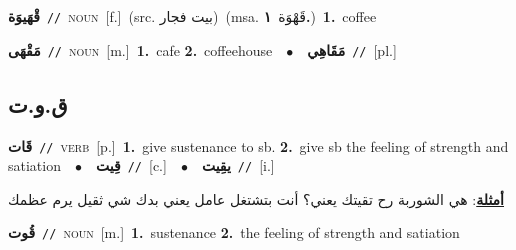 \documentclass[10pt,a4paper,twoside]{article} %
\begin{document}
\begin{multicols}{2}
{\setlength\topsep{0pt}\textbf{\foreignlanguage{arabic}{قْهَيوَة}}\ {\color{gray}\texttt{//}\color{black}}\ \textsc{noun}\ [f.]\ (src. \color{gray}\foreignlanguage{arabic}{بيت فجار}\color{black})\ \color{gray}(msa. \foreignlanguage{arabic}{قَهْوَة}~\foreignlanguage{arabic}{\textbf{١.}})\color{black}\ \textbf{1.}~coffee\ } \vspace{2mm}

{\setlength\topsep{0pt}\textbf{\foreignlanguage{arabic}{مَقْهَى}}\ {\color{gray}\texttt{//}\color{black}}\ \textsc{noun}\ [m.]\ \textbf{1.}~cafe  \textbf{2.}~coffeehouse\ \ $\bullet$\ \ \setlength\topsep{0pt}\textbf{\foreignlanguage{arabic}{مَقَاهِي}}\ {\color{gray}\texttt{//}\color{black}}\ [pl.]\ } \vspace{2mm}

\vspace{-3mm}
\subsection*{\color{blue}\foreignlanguage{arabic}{ق.و.ت}\color{blue}{}} 

{\setlength\topsep{0pt}\textbf{\foreignlanguage{arabic}{قَات}}\ {\color{gray}\texttt{//}\color{black}}\ \textsc{verb}\ [p.]\ \textbf{1.}~give sustenance to sb.  \textbf{2.}~give sb the feeling of strength and satiation\ \ $\bullet$\ \ \setlength\topsep{0pt}\textbf{\foreignlanguage{arabic}{قِيت}}\ {\color{gray}\texttt{//}\color{black}}\ [c.]\ \ $\bullet$\ \ \setlength\topsep{0pt}\textbf{\foreignlanguage{arabic}{يقِيت}}\ {\color{gray}\texttt{//}\color{black}}\ [i.]\  \begin{flushright}\color{gray}\foreignlanguage{arabic}{\textbf{\underline{\foreignlanguage{arabic}{أمثلة}}}: هي الشوربة رح تقيتك يعني؟ أنت بتشتغل عامل يعني بدك شي ثقيل يرم عظمك}\end{flushright}\color{black}} \vspace{2mm}

{\setlength\topsep{0pt}\textbf{\foreignlanguage{arabic}{قُوت}}\ {\color{gray}\texttt{//}\color{black}}\ \textsc{noun}\ [m.]\ \textbf{1.}~sustenance  \textbf{2.}~the feeling of strength and satiation\ } \vspace{2mm}


\end{multicols}
\end{document}
